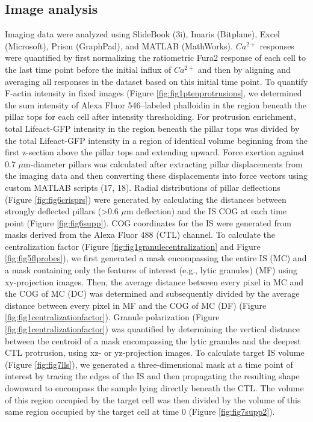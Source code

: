 \subsection{Image analysis}
Imaging data were analyzed using SlideBook (3i), Imaris (Bitplane), Excel (Microsoft), Prism (GraphPad), and MATLAB (MathWorks). $Ca^{2+}$ responses were quantified by first normalizing the ratiometric Fura2 response of each cell to the last time point before the initial influx of $Ca^{2+}$ and then by aligning and averaging all responses in the dataset based on this initial time point. To quantify F-actin intensity in fixed images (Figure \ref{fig:fig1ptenprotrusions}, we determined the sum intensity of Alexa Fluor 546–labeled phalloidin in the region beneath the pillar tops for each cell after intensity thresholding. For protrusion enrichment, total Lifeact-GFP intensity in the region beneath the pillar tops was divided by the total Lifeact-GFP intensity in a region of identical volume beginning from the first z-section above the pillar tops and extending upward. Force exertion against 0.7 $\mu$m-diameter pillars was calculated after extracting pillar displacements from the imaging data and then converting these displacements into force vectors using custom MATLAB scripts (17, 18). Radial distributions of pillar deflections (Figure \ref{fig:fig6crisprs}) were generated by calculating the distances between strongly deflected pillars (>0.6 $\mu$m deflection) and the IS COG at each time point (Figure \ref{fig:fig6supp}). COG coordinates for the IS were generated from masks derived from the Alexa Fluor 488 (CTL) channel. To calculate the centralization factor (Figure \ref{fig:fig1granulecentralization} and Figure \ref{fig:fig5flprobes}), we first generated a mask encompassing the entire IS (MC) and a mask containing only the features of interest (e.g., lytic granules) (MF) using xy-projection images. Then, the average distance between every pixel in MC and the COG of MC (DC) was determined and subsequently divided by the average distance between every pixel in MF and the COG of MC (DF) (Figure \ref{fig:fig1centralizationfactor}). Granule polarization (Figure \ref{fig:fig1centralizationfactor}) was quantified by determining the vertical distance between the centroid of a mask encompassing the lytic granules and the deepest CTL protrusion, using xz- or yz-projection images. To calculate target IS volume (Figure \ref{fig:fig7lls}), we generated a three-dimensional mask at a time point of interest by tracing the edges of the IS and then propagating the resulting shape downward to encompass the sample lying directly beneath the CTL. The volume of this region occupied by the target cell was then divided by the volume of this same region occupied by the target cell at time 0 (Figure \ref{fig:fig7supp2}).

